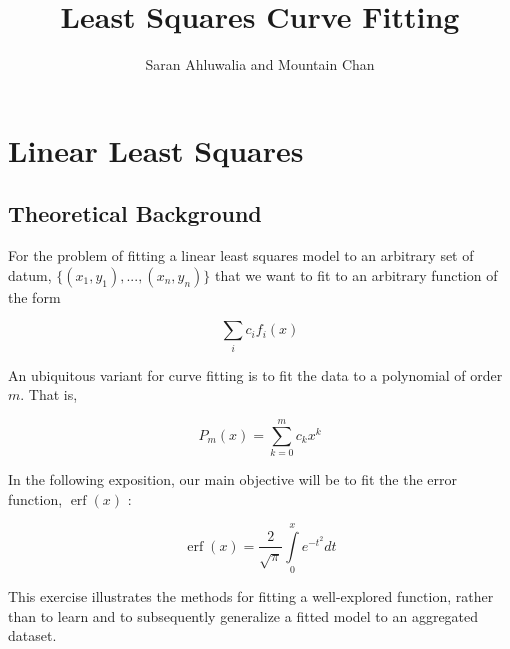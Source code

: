 \documentclass[10pt,a4paper]{article}
\author{Saran Ahluwalia and Mountain Chan}
\title{Least Squares Curve Fitting}
\DeclareMathOperator\erf{erf}
\begin{document}

\maketitle


\section*{Linear Least Squares}

\subsection*{Theoretical Background}

For the problem of fitting a linear least squares model to an arbitrary set of datum, $\{ (x_1, y_1), ... , (x_n, y_n)\}$ that we want to fit to an arbitrary function of the form

\begin{equation}
\sum\limits_i c_i f_i(x)
\label{eqn: arbitrary fit}
\end{equation}

An ubiquitous variant for curve fitting is to fit the data to a polynomial of order $m$. That is,

\begin{equation}
P_m(x) = \sum\limits_{k=0}^m c_k x^k
\label{eqn: general polynomial}
\end{equation}

In the following exposition, our main objective will be to fit the the error function, $\erf{(x)}$ :

\begin{equation}
\erf{(x)} = \frac{2}{\sqrt{\pi}} \int\limits_0^x e^{-t^2} dt
\label{eqn: error function}
\end{equation}

This exercise illustrates the methods for fitting a well-explored function, rather than to learn and to subsequently generalize a fitted model to an aggregated dataset.
\end{document}
